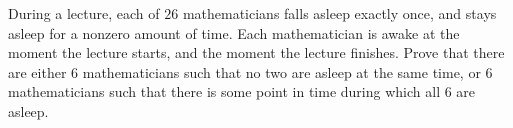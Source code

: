 
During a lecture, each of $26$ mathematicians falls asleep exactly once, and stays asleep for a nonzero amount of time. Each mathematician is awake at the moment the lecture starts, and the moment the lecture finishes. Prove that there are either $6$ mathematicians such that no two are asleep at the same time, or $6$ mathematicians such that there is some point in time during which all $6$ are asleep.


